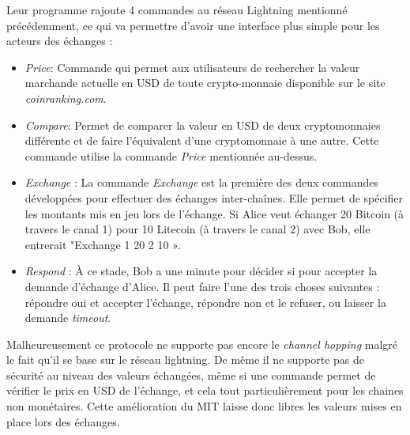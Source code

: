 Leur programme rajoute 4 commandes au réseau Lightning mentionné précédemment, ce qui va permettre d'avoir une interface plus simple pour les acteurs des échanges :
\begin{itemize}
    \item \textit{Price}: Commande qui permet aux utilisateurs de rechercher la valeur marchande actuelle en USD de toute crypto-monnaie disponible sur le site \textit{coinranking.com}.\\
    \item \textit{Compare}: Permet de comparer la valeur en USD de deux cryptomonnaies différente et de faire l'équivalent d'une cryptomonnaie à une autre. Cette commande utilise la commande \textit{Price} mentionnée au-dessus.\\
    \item \textit{Exchange} : La commande \textit{Exchange} est la première des deux commandes développées pour effectuer des échanges inter-chaînes. Elle permet de spécifier les montants mis en jeu lors de l'échange. Si Alice veut échanger 20 \gls{Bitcoin} (à travers le canal 1) pour 10 Litecoin (à travers le canal 2) avec Bob, elle entrerait "Exchange 1 20 2 10 ».\\
    \item \textit{Respond} : À ce stade, Bob a une minute pour décider si pour accepter la demande d'échange d'Alice. Il peut faire l'une des trois choses suivantes : répondre oui et accepter l'échange, répondre non et le refuser, ou laisser la demande \textit{timeout}.\\
\end{itemize}


Malheureusement ce protocole ne supporte pas encore le \textit{channel hopping} malgré le fait qu'il se base sur le réseau lightning. 
De même il ne supporte pas de sécurité au niveau des valeurs échangées, même si une commande permet de vérifier le prix en USD de l'échange, et cela tout particulièrement pour les chaines non monétaires.
Cette amélioration du MIT laisse donc libres les valeurs mises en place lors des échanges. 
